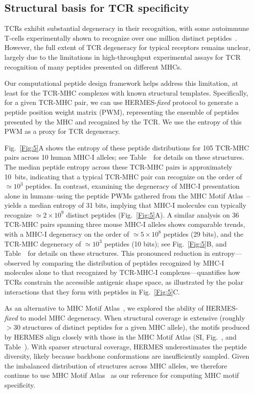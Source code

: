 \subsection{Structural basis for TCR specificity}
TCRs exhibit substantial degeneracy in their recognition, with some autoimmune T-cells
experimentally shown to recognize over one million distinct peptides~\cite{Wooldridge2012-zq}.
However, the full extent of TCR degeneracy for typical receptors remains unclear, largely due to the
limitations in high-throughput experimental assays for TCR recognition of many peptides presented on
different MHCs.

Our computational peptide design framework helps address this limitation, at least for the TCR-MHC
complexes with known structural templates. Specifically, for a given TCR-MHC pair, we can use
HERMES-{\em fixed} protocol to generate a peptide position weight matrix (PWM), representing the
ensemble of peptides presented by the MHC and recognized by the TCR. We use the entropy of this PWM
as a proxy for TCR degeneracy.

Fig.~\ref{Fig:5}A shows the entropy of these peptide distributions for 105 TCR-MHC pairs across 10
human MHC-I alleles; see Table~\AllPdbsTable~for details on these structures. The median peptide
entropy across these TCR-MHC pairs is approximately 10~bits, indicating that a typical TCR-MHC pair
can recognize on the order of $ \simeq 10^3$ peptides. In contrast, examining the degeneracy of
MHC-I presentation alone in humans--using the peptide PWMs gathered from the MHC Motif
Atlas~\cite{Tadros2023-ij}--yields a median entropy of 31 bits, implying that MHC-I molecules can
typically recognize $\simeq 2\times 10^{9}$ distinct peptides (Fig.~\ref{Fig:5}A). A similar
analysis on 36 TCR-MHC pairs spanning three mouse MHC-I alleles shows comparable trends, with a
MHC-I degeneracy on the order of $\simeq5 \times 10^8$ peptides (29 bits), and the TCR-MHC
degeneracy of $\simeq 10^3$ {peptides} (10 bits); see Fig.~\ref{Fig:5}B, and Table~\AllPdbsTable~for
details on these structures. This pronounced reduction in entropy---observed by comparing the
distribution of peptides recognized by MHC-I molecules alone to that recognized by TCR-MHC-I
complexes---quantifies how TCRs constrain the accessible antigenic shape space, as illustrated by
the polar interactions that they form with peptides in Fig.~\ref{Fig:5}C.

{As an alternative to MHC Motif Atlas~\cite{Tadros2023-ij}, we explored the ability of HERMES-{\em
fixed} to model MHC degeneracy. When structural coverage is extensive (roughly $>30$ structures of
distinct peptides for a given MHC allele), the motifs produced by HERMES align closely with those in
the MHC Motif Atlas (SI, Fig.~\pMHCPWMsFigure, and Table~\pMHCPWMsTInfoable). With sparser
structural coverage, HERMES underestimates the peptide diversity, likely because backbone
conformations are insufficiently sampled. Given the imbalanced distribution of structures across MHC
alleles, we therefore continue to use MHC Motif Atlas~\cite{Tadros2023-ij} as our reference for
computing MHC motif specificity.}

